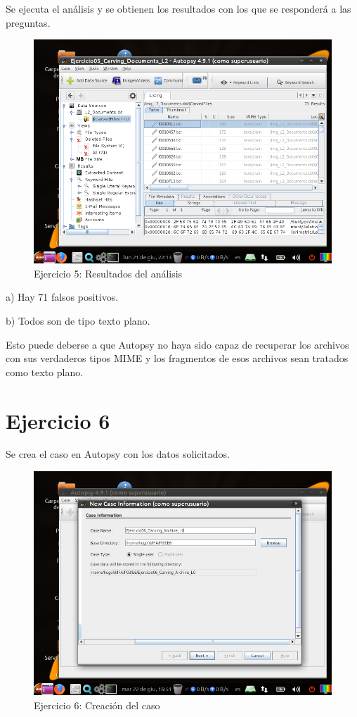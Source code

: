 \documentclass[11pt]{article}
\begin{document}
Se ejecuta el análisis y se obtienen los resultados con los que se responderá a las preguntas.

\begin{figure}[H]
    \caption{Ejercicio 5: Resultados del análisis}
    \centering
    \includegraphics[scale=0.7]{e5-5.png}
\end{figure}

a) Hay 71 falsos positivos.

b) Todos son de tipo texto plano.

Esto puede deberse a que Autopsy no haya sido capaz de recuperar los archivos con sus verdaderos tipos MIME y los fragmentos de esos archivos sean tratados como texto plano.

\section{Ejercicio 6}
Se crea el caso en Autopsy con los datos solicitados.

\begin{figure}[H]
    \caption{Ejercicio 6: Creación del caso}
    \centering
    \includegraphics[scale=0.7]{e6-1.png}
\end{figure}
\end{document}
